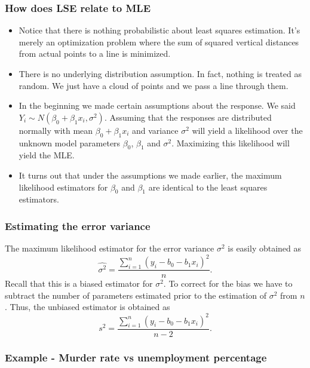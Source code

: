 \begin{frame}[fragile]\frametitle{How does LSE relate to MLE}

\begin{itemize}
\item Notice that there is nothing probabilistic about least squares estimation. It's merely an optimization problem where the sum of squared vertical distances from actual points to a line is minimized.
\item There is no underlying distribution assumption. In fact, nothing is treated as random. We just have a cloud of points and we pass a line through them.
\item In the beginning we made certain assumptions about the response. We said $Y_{i}\sim N(\beta_{0}+\beta_{1}x_{i},\sigma^{2})$. Assuming that the responses are distributed normally with mean $\beta_{0}+\beta_{1}x_{i}$ and variance $\sigma^{2}$ will yield a likelihood over the unknown model parameters $\beta_{0}$, $\beta_{1}$ and $\sigma^{2}$. Maximizing this likelihood will yield the MLE.
\item It turns out that under the assumptions we made earlier, the maximum likelihood estimators for $\beta_{0}$ and $\beta_{1}$ are identical to the least squares estimators.  
\end{itemize}
\end{frame}

\begin{frame}[fragile]\frametitle{Estimating the error variance}

The maximum likelihood estimator for the error variance $\sigma^{2}$ is easily obtained as
\begin{displaymath}
\hat{\sigma^{2}}=\frac{\sum_{i=1}^{n}(y_{i}-b_{0}-b_{1}x_{i})^{2}}{n}.
\end{displaymath}
Recall that this is a biased estimator for $\sigma^{2}$. To correct for the bias we have to subtract the number of parameters estimated prior to the estimation of $\sigma^{2}$ from $n$. Thus, the unbiased estimator is obtained as
\begin{displaymath}
s^{2}=\frac{\sum_{i=1}^{n}(y_{i}-b_{0}-b_{1}x_{i})^{2}}{n-2}.
\end{displaymath}
\end{frame}


\begin{frame}[fragile]\frametitle{Example - Murder rate vs unemployment percentage}

\end{frame}

